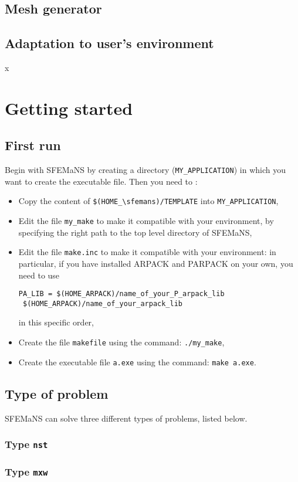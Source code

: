 \documentclass{book}
\makeatletter
\newcommand{\sfemans}{SFEMaNS\@\xspace}\newcommand{\petsc}{PETSc\@\xspace}
\makeatother
\begin{document}
\section{Mesh generator}
\section{Adaptation to user's environment}

x\chapter{Getting started}
\section{First run}
Begin with \sfemans by creating a directory
(\eg \verb?MY_APPLICATION?) in which you want to create the
executable file. Then you need to :
\begin{itemize}
\item Copy the content of \verb?$(HOME_\sfemans)/TEMPLATE? into
  \verb?MY_APPLICATION?,
\item Edit the file \verb?my_make? to make it compatible with your
  environment, by specifying the right path to the top level directory
  of \sfemans,
\item Edit the file \verb?make.inc? to make it compatible with your
  environment: in particular, if you have installed ARPACK and PARPACK
  on your own, you need to use
\begin{verbatim}
PA_LIB = $(HOME_ARPACK)/name_of_your_P_arpack_lib
 $(HOME_ARPACK)/name_of_your_arpack_lib
\end{verbatim}
in this specific order,
\item Create the file \verb?makefile? using the command:
  \verb?./my_make?,
\item Create the executable file \verb?a.exe? using the command: \verb?make a.exe?.
\end{itemize}
\section{Type of problem}
\sfemans can solve three different types of problems, listed below.
\subsection{Type \texttt{nst}}
\subsection{Type \texttt{mxw}}
\end{document}
